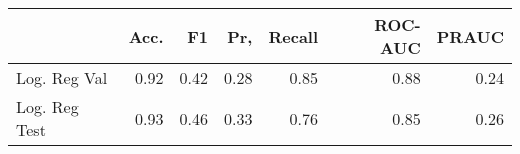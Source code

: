 \begin{tabular}{lrrrrrr}
\toprule
{} &  Acc. &    F1 &   Pr, &  Recall &  ROC-AUC &  PRAUC \\
\midrule
Log. Reg Val  &  0.92 &  0.42 &  0.28 &    0.85 &     0.88 &   0.24 \\
Log. Reg Test &  0.93 &  0.46 &  0.33 &    0.76 &     0.85 &   0.26 \\
\bottomrule
\end{tabular}
